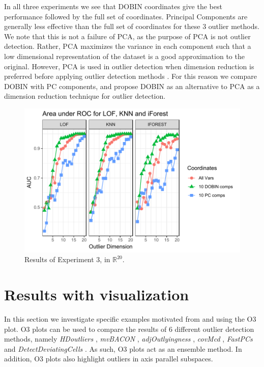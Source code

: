 \documentclass[11pt]{article}
\begin{document}
In all three experiments we see that DOBIN coordinates give the best performance followed by the full set of coordinates. Principal Components are generally less effective than the full set of coordinates for these $3$ outlier methods. We note that this is not a failure of PCA, as the purpose of PCA is not outlier detection. Rather, PCA maximizes the variance in each component such that a low dimensional representation of the dataset is a good approximation to the original. However, PCA is used in outlier detection when dimension reduction is preferred before applying outlier detection methods \citep{talagala2019anomaly, hyndman2015large}. For this reason we compare DOBIN with PC components, and propose DOBIN as an alternative to PCA as a dimension reduction technique for outlier detection.



\begin{figure}[!t]
	\centering
	\includegraphics[scale=0.8]{Exp3.pdf}
	\caption{Results of Experiment 3, in $\mathbb{R}^{20}$.}
	\label{fig:Exp3}
\end{figure} 

\section{Results with visualization}\label{sec:ResWithVis}
In this section we investigate specific examples motivated from \cite{unwin2019multivariate} and \cite{wilkinson2017visualizing} using the O3 plot. O3 plots \citep{unwin2019multivariate} can be used to compare the results of $6$ different outlier detection methods, namely \textit{HDoutliers} \citep{wilkinson2017visualizing}, \textit{mvBACON} \citep{billor2000bacon},  \textit{adjOutlyingness} \citep{brys2005robustification}, \textit{covMcd} \citep{rousseeuw1999fast} , \textit{FastPCs} \citep{vakili2014finding} and \textit{DetectDeviatingCells} \citep{rousseeuw2018detecting}. As such, O3 plots act as an ensemble method. In addition, O3 plots also highlight outliers in axis parallel subspaces. 
\end{document}
